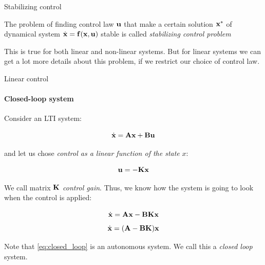 \documentclass{beamer}
\begin{document}
\begin{frame}{Stabilizing control}
\begin{flushleft}

\begin{definition}
The problem of finding control law $\mathbf{u}$ that make a certain solution $\mathbf{x}^*$ of dynamical system $\dot{\mathbf{x}} = \mathbf{f}(\mathbf{x}, \mathbf{u})$ stable is called \emph{stabilizing control problem}
\end{definition}

\bigskip

This is true for both linear and non-linear systems. But for linear systems we can get a lot more details about this problem, if we restrict our choice of control law.



\end{flushleft}
\end{frame}



\begin{frame}{Linear control}
\framesubtitle{Closed-loop system}
\begin{flushleft}

Consider an LTI system:

\begin{equation}
    \dot{\mathbf{x}} = \mathbf{A}\mathbf{x} + \mathbf{B}\mathbf{u}
\end{equation}

and let us chose \emph{control as a linear function of the state} $x$:

\begin{equation}
    \mathbf{u} = -\mathbf{K}\mathbf{x}
\end{equation}

We call matrix $\mathbf{K}$ \emph{control gain}. Thus, we know how the system is going to look when the control is applied:

\begin{equation}
    \dot{\mathbf{x}} = \mathbf{A}\mathbf{x} - \mathbf{B}\mathbf{K}\mathbf{x}
\end{equation}
\begin{equation}
\label{eq:closed_loop}
    \dot{\mathbf{x}} = (\mathbf{A} - \mathbf{B}\mathbf{K})\mathbf{x}
\end{equation}

Note that \eqref{eq:closed_loop} is an autonomous system. We call this a \emph{closed loop} system.

\end{flushleft}
\end{frame}
\end{document}
